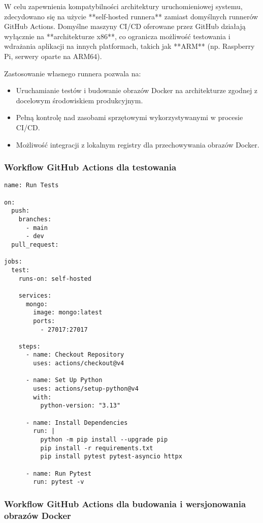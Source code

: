 W celu zapewnienia kompatybilności architektury uruchomieniowej systemu, zdecydowano się na użycie **self-hosted runnera** zamiast domyślnych runnerów GitHub Actions. Domyślne maszyny CI/CD oferowane przez GitHub działają wyłącznie na **architekturze x86**, co ogranicza możliwość testowania i wdrażania aplikacji na innych platformach, takich jak **ARM** (np. Raspberry Pi, serwery oparte na ARM64). 

Zastosowanie własnego runnera pozwala na:
\begin{itemize}
    \item Uruchamianie testów i budowanie obrazów Docker na architekturze zgodnej z docelowym środowiskiem produkcyjnym.
    \item Pełną kontrolę nad zasobami sprzętowymi wykorzystywanymi w procesie CI/CD.
    \item Możliwość integracji z lokalnym registry dla przechowywania obrazów Docker.
\end{itemize}

\subsubsection{Workflow GitHub Actions dla testowania}

\begin{verbatim}
name: Run Tests

on:
  push:
    branches:
      - main
      - dev
  pull_request:

jobs:
  test:
    runs-on: self-hosted

    services:
      mongo:
        image: mongo:latest
        ports:
          - 27017:27017

    steps:
      - name: Checkout Repository
        uses: actions/checkout@v4

      - name: Set Up Python
        uses: actions/setup-python@v4
        with:
          python-version: "3.13"

      - name: Install Dependencies
        run: |
          python -m pip install --upgrade pip
          pip install -r requirements.txt
          pip install pytest pytest-asyncio httpx

      - name: Run Pytest
        run: pytest -v
\end{verbatim}

\subsubsection{Workflow GitHub Actions dla budowania i wersjonowania obrazów Docker}

